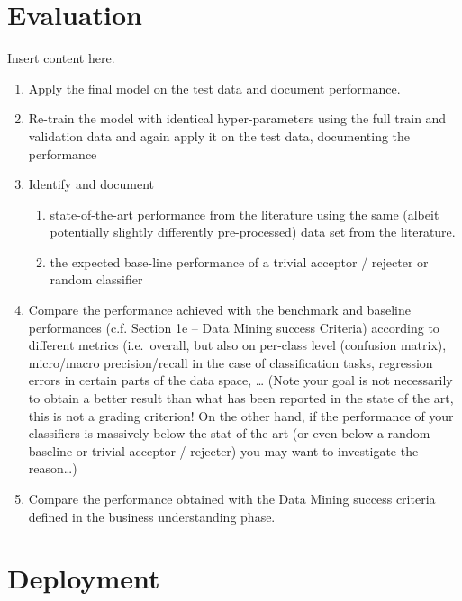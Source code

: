 \documentclass[sigchi]{acmart}
\def\tightlist{}
\begin{document}
\hypertarget{evaluation}{%
\section{Evaluation}\label{evaluation}}

Insert content here.

\begin{enumerate}
\def\labelenumi{\alph{enumi}.}
\tightlist
\item
  Apply the final model on the test data and document performance.
\item
  Re-train the model with identical hyper-parameters using the full train and validation data and again apply it on the test data, documenting the performance
\item
  Identify and document

  \begin{enumerate}
  \def\labelenumii{\roman{enumii}.}
  \tightlist
  \item
    state-of-the-art performance from the literature using the same (albeit potentially slightly differently pre-processed) data set from the literature.
  \item
    the expected base-line performance of a trivial acceptor / rejecter or random classifier
  \end{enumerate}
\item
  Compare the performance achieved with the benchmark and baseline performances (c.f. Section 1e -- Data Mining success Criteria) according to different metrics (i.e.~overall, but also on per-class level (confusion matrix), micro/macro precision/recall in the case of classification tasks, regression errors in certain parts of the data space, \ldots{} (Note your goal is not necessarily to obtain a better result than what has been reported in the state of the art, this is not a grading criterion! On the other hand, if the performance of your classifiers is massively below the stat of the art (or even below a random baseline or trivial acceptor / rejecter) you may want to investigate the reason\ldots)
\item
  Compare the performance obtained with the Data Mining success criteria defined in the business understanding phase.
\end{enumerate}

\hypertarget{deployment}{%
\section{Deployment}\label{deployment}}
\end{document}
